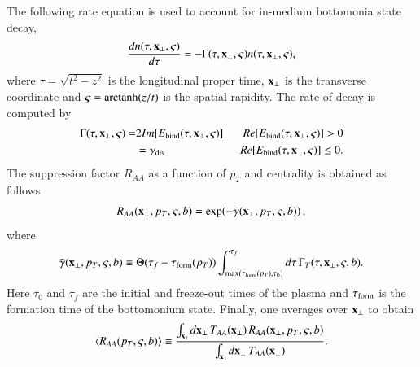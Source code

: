 The following rate equation is used to account for in-medium bottomonia state decay,
%
\begin{equation} \label{eq:rate}
\frac{dn(\tau,{\bf x}_\perp,\varsigma)}{d\tau} = -\Gamma(\tau,{\bf x}_\perp,\varsigma)n(\tau,{\bf x}_\perp,\varsigma) ,
\end{equation}
%
where   $\tau = \sqrt{t^{2} - z^{2}}$ is the longitudinal proper time,  ${\bf x}_{\perp}$ is the transverse coordinate and 
 $\varsigma = {\rm arctanh}(z/t)$ is the spatial rapidity. The rate of decay is computed by~\cite{Strickland:2011aa}
%
\begin{eqnarray}
\Gamma(\tau, {\bf x}_{\perp}, \varsigma) = 
& 2Im[E_{\text{bind}}(\tau, {\bf x}_{\perp}, \varsigma)] & \ \ Re[E_{\text{bind}}(\tau, {\bf x}_{\perp}, \varsigma)] > 0 \\ 
& = \gamma_{\text{dis}} & \ \ Re[E_{\text{bind}}(\tau, {\bf x}_{\perp}, \varsigma)] \leq 0. 
\end{eqnarray}
%
The suppression factor $R_{AA}$ as a function of $p_T$ and centrality 
is obtained as follows
\begin{equation}
R_{AA}({\bf x}_\perp,p_T,\varsigma,b) =%
\exp\!\left(-\bar{\gamma}({\bf x}_\perp,p_T,\varsigma,b) \right),
\end{equation}
where
\begin{equation}
 \bar{\gamma}({\bf x}_\perp,p_T,
\varsigma,b) \equiv \Theta(\tau_f-\tau_{\rm form}(p_T)) \int_{{\rm max}(\tau_{\rm form}(p_T),\tau_0)}^{\tau_f} 
d\tau\,\Gamma_T(\tau,{\bf x}_\perp,\varsigma,b).
\end{equation}
  Here $\tau_{0}$ and $\tau_{f}$ are the initial and freeze-out times of the plasma and 
$\tau_{\rm form}$ is the formation time of the bottomonium state. 
Finally, one averages
over ${\bf x}_\perp$ to obtain 
\begin{equation}
\langle R_{AA}(p_T,\varsigma,b) \rangle \equiv 
\frac{\int_{{\bf x}_\perp} \! d{\bf x}_\perp \, T_{AA}({\bf x}_\perp)\,%
  R_{AA}({\bf x}_\perp,p_T,\varsigma,b)} 
{\int_{{\bf x}_\perp} \! d{\bf x}_\perp \, T_{AA}({\bf x}_\perp)}.
\end{equation} 

